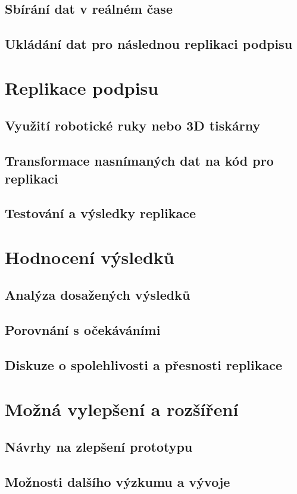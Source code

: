 \section{Sbírání dat v reálném čase}
\section{Ukládání dat pro následnou replikaci podpisu}

\chapter{Replikace podpisu}
\section{Využití robotické ruky nebo 3D tiskárny}
\section{Transformace nasnímaných dat na kód pro replikaci}
\section{Testování a výsledky replikace}

\chapter{Hodnocení výsledků}
\section{Analýza dosažených výsledků}
\section{Porovnání s očekáváními}
\section{Diskuze o spolehlivosti a přesnosti replikace}

\chapter{Možná vylepšení a rozšíření}
\section{Návrhy na zlepšení prototypu}
\section{Možnosti dalšího výzkumu a vývoje}

